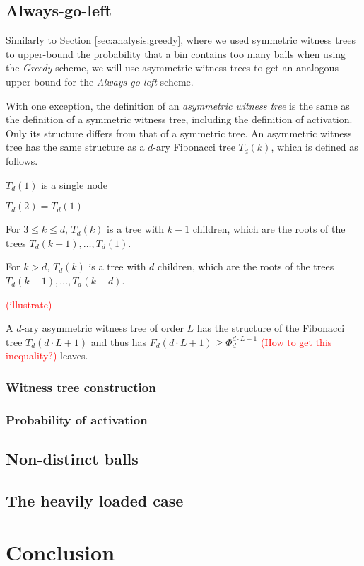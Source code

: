 \documentclass[a4paper,12pt]{article}
\newcommand\todo[1]{\textcolor{red}{(#1)}}
\begin{document}
\subsection{Always-go-left}
\label{sec:analysis:alg}
Similarly to Section \ref{sec:analysis:greedy}, where we used symmetric witness trees to upper-bound the probability that a bin contains too many balls when using the \emph{Greedy} scheme, we will use asymmetric witness trees to get an analogous upper bound for the \emph{Always-go-left} scheme. 

With one exception, the definition of an \emph{asymmetric witness tree} is the same as the definition of a symmetric witness tree, including the definition of activation. Only its structure differs from that of a symmetric tree. An asymmetric witness tree has the same structure as a $d$-ary Fibonacci tree $T_d\left(k \right)$, which is defined as follows.
\begin{compactitem}
\item $T_d(1)$ is a single node
\item $T_d(2) = T_d(1)$  
\item For $3\leq k \leq d$, $T_d(k)$ is a tree with $k-1$ children, which are the roots of the trees $T_d(k-1),\ldots,T_d(1)$.
\item For $k>d$, $T_d(k)$ is a tree with $d$ children, which are the roots of the trees $T_d(k-1),\ldots,T_d(k-d)$.
\end{compactitem}
\todo{illustrate}

A $d$-ary asymmetric witness tree of order $L$ has the structure of the Fibonacci tree $T_d(d \cdot L+1)$ and thus has $F_d(d\cdot L + 1) \geq \Phi_d^{d\cdot L-1}$ \todo{How to get this inequality?} leaves. 

\subsubsection{Witness tree construction}
\label{sec:analysis:constructionAsymWT}

\subsubsection{Probability of activation}
\label{sec:analysis:probabilityAsymWT}


\subsection{Non-distinct balls}
\label{sec:analysis:nondistinctBalls}

\subsection{The heavily loaded case}
\label{sec:analysis:moreBalls}



\section{Conclusion}
\label{sec:conclusion}


 
\end{document}
